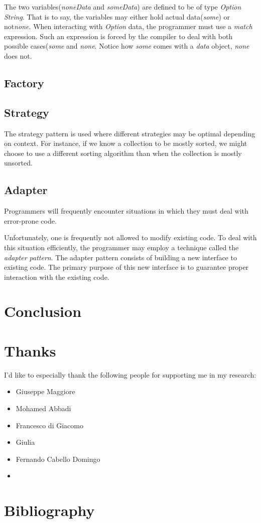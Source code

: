 \documentclass{article}
\begin{document}
\begin{lstlisting}[language=Python]
\end{lstlisting}

The two variables({\em noneData} and {\em someData}) are defined to be of type {\em Option String}.
That is to say, the variables may either hold actual data({\em some}) or not{\em none}.
When interacting with {\em Option} data, the programmer must use a {\em match} expression.
Such an expression is forced by the compiler to deal with both possible cases({\em some} and {\em none}.
Notice how {\em some} comes with a {\em data} object, {\em none} does not.

\subsection{Factory}
\subsection{Strategy}
The strategy pattern is used where different strategies may be optimal depending on context.
For instance, if we know a collection to be mostly sorted, we might choose to use a different sorting algorithm than when the collection is mostly unsorted.


\subsection{Adapter}
Programmers will frequently encounter situations in which they must deal with error-prone code.

Unfortunately, one is frequently not allowed to modify existing code.
To deal with this situation efficiently, the programmer may employ a technique called the {\em adapter pattern}.
The adapter pattern consists of building a new interface to existing code.
The primary purpose of this new interface is to guarantee proper interaction with the existing code.

\newpage

\section{Conclusion}

\section{Thanks}
I'd like to especially thank the following people for supporting me in my research:
\begin{itemize}
\item{Giuseppe Maggiore}
\item{Mohamed Abbadi}
\item{Francesco di Giacomo}
\item{Giulia }
\item{Fernando Cabello Domingo}
\item{}
\end{itemize}

\section{Bibliography}


\fi
\end{document}
